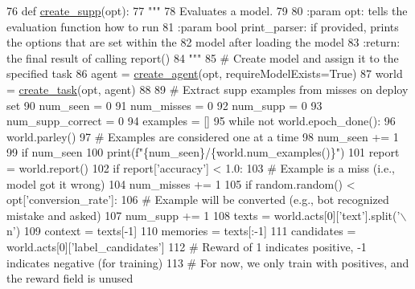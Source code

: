 \begin{DoxyCode}
76 \textcolor{keyword}{def }\hyperlink{namespaceprojects_1_1self__feeding_1_1scripts_1_1create__synth__supp_a81cbb13896d9614507b68362e90d8f6c}{create\_supp}(opt):
77     \textcolor{stringliteral}{"""}
78 \textcolor{stringliteral}{    Evaluates a model.}
79 \textcolor{stringliteral}{}
80 \textcolor{stringliteral}{    :param opt: tells the evaluation function how to run}
81 \textcolor{stringliteral}{    :param bool print\_parser: if provided, prints the options that are set within the}
82 \textcolor{stringliteral}{        model after loading the model}
83 \textcolor{stringliteral}{    :return: the final result of calling report()}
84 \textcolor{stringliteral}{    """}
85     \textcolor{comment}{# Create model and assign it to the specified task}
86     agent = \hyperlink{namespaceparlai_1_1core_1_1agents_ad0d54074d4bcc148bb415ab5515a53b5}{create\_agent}(opt, requireModelExists=\textcolor{keyword}{True})
87     world = \hyperlink{namespaceparlai_1_1core_1_1worlds_a11923c10b545c7ecc1b08fe2242d9c2c}{create\_task}(opt, agent)
88 
89     \textcolor{comment}{# Extract supp examples from misses on deploy set}
90     num\_seen = 0
91     num\_misses = 0
92     num\_supp = 0
93     num\_supp\_correct = 0
94     examples = []
95     \textcolor{keywordflow}{while} \textcolor{keywordflow}{not} world.epoch\_done():
96         world.parley()
97         \textcolor{comment}{# Examples are considered one at a time}
98         num\_seen += 1
99         \textcolor{keywordflow}{if} num\_seen %
100             print(f\textcolor{stringliteral}{"\{num\_seen\}/\{world.num\_examples()\}"})
101         report = world.report()
102         \textcolor{keywordflow}{if} report[\textcolor{stringliteral}{'accuracy'}] < 1.0:
103             \textcolor{comment}{# Example is a miss (i.e., model got it wrong)}
104             num\_misses += 1
105             \textcolor{keywordflow}{if} random.random() < opt[\textcolor{stringliteral}{'conversion\_rate'}]:
106                 \textcolor{comment}{# Example will be converted (e.g., bot recognized mistake and asked)}
107                 num\_supp += 1
108                 texts = world.acts[0][\textcolor{stringliteral}{'text'}].split(\textcolor{stringliteral}{'\(\backslash\)n'})
109                 context = texts[-1]
110                 memories = texts[:-1]
111                 candidates = world.acts[0][\textcolor{stringliteral}{'label\_candidates'}]
112                 \textcolor{comment}{# Reward of 1 indicates positive, -1 indicates negative (for training)}
113                 \textcolor{comment}{# For now, we only train with positives, and the reward field is unused}

\end{DoxyCode}
